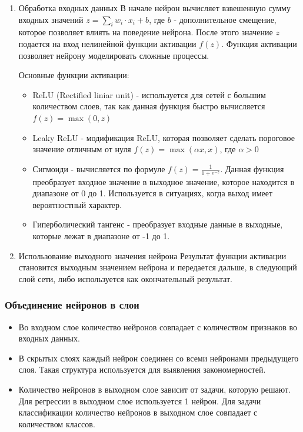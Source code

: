 {\begin{enumerate}
    \item Обработка входных данных
          В начале нейрон вычисляет взвешенную сумму входных значений \(z = \sum_{i} w_{i} \cdot x_{i} + b\),
          где \(b\) - дополнительное смещение, которое позволяет влиять на поведение нейрона.
          После этого значение \(z\) подается на вход нелинейной функции активации \(f(z)\). Функция активации
          позволяет нейрону моделировать сложные процессы.

          Основные функции активации:
          \begin{itemize}
              \item ReLU (Rectified liniar unit) - используется для сетей с большим количеством слоев, так как
                    данная функция быстро вычисляется \(f(z) = \max(0, z)\)
              \item Leaky ReLU - модификация ReLU, которая позволяет сделать пороговое значение отличным от нуля
                    \(f(z) = \max(\alpha x,x)\), где \(\alpha>0\)
              \item Сигмоиди - вычисляется по формуле \(f(z) = \frac{1}{1 + e^{-z}}\). Данная функция преобразует
                    входное значение в выходное значение, которое находится в диапазоне от 0 до 1. Используется в
                    ситуациях, когда выход имеет вероятностный характер.
              \item Гиперболический тангенс - преобразует входные данные в выходные, которые лежат в диапазоне от
                    -1 до 1.
          \end{itemize}

    \item Использование выходного значения нейрона
          Результат функции активации становится выходным значением нейрона и передается дальше, в
          следующий слой сети, либо используется как окончательный результат.
\end{enumerate}
\subsubsection{Объединение нейронов в слои}

\begin{itemize}
    \item Во входном слое количество нейронов совпадает с количеством признаков во входных данных.
    \item В скрытых слоях каждый нейрон соединен со всеми нейронами предыдущего слоя. Такая структура
          используется для выявления закономерностей.
    \item Количество нейронов в выходном слое зависит от задачи, которую решают. Для регрессии в выходном
          слое используется 1 нейрон. Для задачи классификации количество нейронов в выходном слое совпадает
          с количеством классов.
\end{itemize}
}
